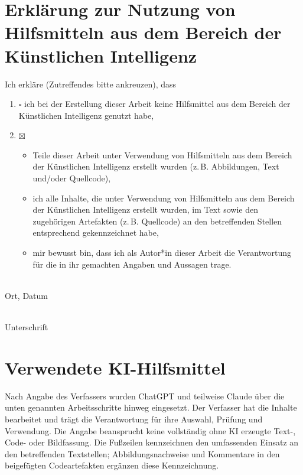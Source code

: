 \clearpage
\chapter*{Erklärung zur Nutzung von Hilfsmitteln aus dem Bereich der Künstlichen Intelligenz}
Ich erkläre (Zutreffendes bitte ankreuzen), dass
\begin{enumerate}[label=(\arabic*)]
\item $\square$ ich bei der Erstellung dieser Arbeit keine Hilfsmittel aus dem Bereich der Künstlichen Intelligenz genutzt habe,
\item $\boxtimes$
\begin{itemize}
\item Teile dieser Arbeit unter Verwendung von Hilfsmitteln aus dem Bereich der Künstlichen Intelligenz erstellt wurden (z.\,B. Abbildungen, Text und/oder Quellcode),
\item ich alle Inhalte, die unter Verwendung von Hilfsmitteln aus dem Bereich der Künstlichen Intelligenz erstellt wurden, im Text sowie den zugehörigen Artefakten (z.\,B. Quellcode) an den betreffenden Stellen entsprechend gekennzeichnet habe,
\item mir bewusst bin, dass ich als Autor*in dieser Arbeit die Verantwortung für die in ihr gemachten Angaben und Aussagen trage.
\end{itemize}
\end{enumerate}
\vspace{1cm}

\noindent\parbox[t]{.47\textwidth}{\hrulefill\\Ort, Datum}\hfill
\parbox[t]{.47\textwidth}{\hrulefill\\Unterschrift}
\clearpage
\chapter*{Verwendete KI-Hilfsmittel}
Nach Angabe des Verfassers wurden ChatGPT und teilweise Claude über die unten genannten
Arbeitsschritte hinweg eingesetzt. Der Verfasser hat die Inhalte bearbeitet und trägt die
Verantwortung für ihre Auswahl, Prüfung und Verwendung. Die Angabe beansprucht keine
vollständig ohne KI erzeugte Text-, Code- oder Bildfassung. Die Fußzeilen kennzeichnen
den umfassenden Einsatz an den betreffenden Textstellen; Abbildungsnachweise und
Kommentare in den beigefügten Codeartefakten ergänzen diese Kennzeichnung.

